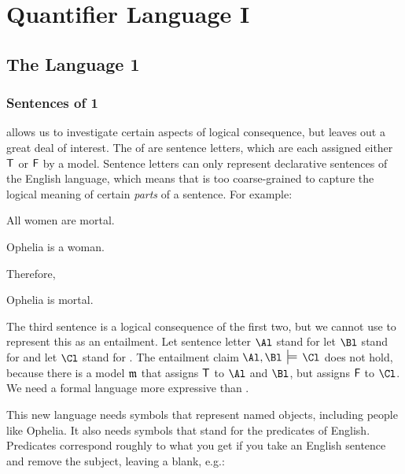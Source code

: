 
\chapter{Quantifier Language I}\label{quantifierlogic1}

\section{The Language \GQL{}1}


\subsection{Sentences of \GQL{}1}\label{Sec:GQLSymbols1}
\GSL{} allows us to investigate certain aspects of logical consequence, but leaves out a great deal of interest.  The  of \GSL{} are sentence letters, which are each assigned either $\mathsf{T}$ or $\mathsf{F}$ by a model.  Sentence letters can only represent declarative sentences of the English language, which means that \GSL{} is too coarse-grained to capture the logical meaning of certain \emph{parts} of a sentence.  For example:

\begin{RESTARTmenumerate}
\item All women are mortal.
\item Ophelia is a woman.

Therefore,

\item Ophelia is mortal.
\end{RESTARTmenumerate}

\noindent{}The third sentence is a logical consequence of the first two, but we cannot use \GSL{} to represent this as an entailment.  Let sentence letter $\Al$ stand for  let $\Bl$ stand for  and let $\Cl$ stand for .  
The entailment claim $\Al, \Bl \:\sdtstile{}{}\: \Cl$ does not hold, because there is a model $\mathfrak{m}$ that assigns $\mathsf{T}$ to $\Al$ and $\Bl$, but assigns $\mathsf{F}$ to $\Cl$.  We need a formal language more expressive than \GSL{}.

This new language needs symbols that represent named objects, including people like Ophelia.  It also needs symbols that stand for the predicates of English.  Predicates correspond roughly to what you get if you take an English sentence and remove the subject, leaving a blank, e.g.: 


